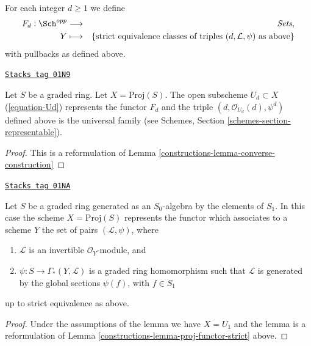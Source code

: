 \medskip\noindent
For each integer $d \geq 1$ we define
\begin{eqnarray*}
F_d : \Sch^{opp} & \longrightarrow & \textit{Sets}, \\
Y & \longmapsto &
\{\text{strict equivalence classes of triples }
(d, \mathcal{L}, \psi)
\text{ as above}\}
\end{eqnarray*}
with pullbacks as defined above.

\begin{lemma}
\label{constructions-lemma-proj-functor-strict}
\href{https://stacks.math.columbia.edu/tag/01N9}{\texttt{Stacks tag 01N9}}

Let $S$ be a graded ring.
Let $X = \text{Proj}(S)$.
The open subscheme $U_d \subset X$ (\ref{equation-Ud}) represents the
functor $F_d$ and the triple $(d, \mathcal{O}_{U_d}(d), \psi^d)$
defined above is the universal family (see
Schemes, Section \ref{schemes-section-representable}).
\end{lemma}

\begin{proof}

This is a reformulation of Lemma \ref{constructions-lemma-converse-construction}
\end{proof}

\begin{lemma}[Apply]
\label{constructions-lemma-apply}
\href{https://stacks.math.columbia.edu/tag/01NA}{\texttt{Stacks tag 01NA}}

Let $S$ be a graded ring generated as an $S_0$-algebra by
the elements of $S_1$. In this case the scheme $X = \text{Proj}(S)$
represents the functor which associates to a scheme
$Y$ the set of pairs $(\mathcal{L}, \psi)$, where
\begin{enumerate}
\item $\mathcal{L}$ is an invertible $\mathcal{O}_Y$-module, and
\item $\psi : S \to \Gamma_*(Y, \mathcal{L})$ is a graded
ring homomorphism such that $\mathcal{L}$ is generated by
the global sections $\psi(f)$, with $f \in S_1$
\end{enumerate}
up to strict equivalence as above.
\end{lemma}

\begin{proof}

Under the assumptions of the lemma we have $X = U_1$ and the
lemma is a reformulation of Lemma \ref{constructions-lemma-proj-functor-strict} above.
\end{proof}

